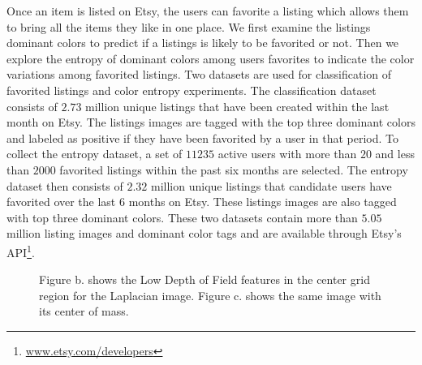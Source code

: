 \documentclass[conference,a4paper]{IEEEtran}
\begin{document}
Once an item is listed on Etsy, the
users can favorite a listing which allows them to bring all the items
they like in one place. We first examine the listings dominant colors
to predict if a listings is likely to be favorited or not. Then we
explore the entropy of dominant colors among users favorites to
indicate the color variations among favorited listings.
 Two datasets are used for
classification of favorited listings and color entropy
experiments. The classification dataset consists of $2.73$ million unique
listings that have been created within the last month on Etsy. The
listings images are tagged with the top three dominant colors and
labeled as positive if they have been favorited by a user in that period. 
To collect the entropy dataset, a set of $11235$ active users with more
than $20$ and less than $2000$ favorited listings within the past six
months are selected. The entropy dataset then consists of $2.32$ million unique listings that candidate
users have favorited over the last 6 months on Etsy. These listings
images are also tagged with top three dominant colors. These two
datasets contain more than $5.05$ million listing images and dominant
color tags and are available through Etsy's API\footnote{\url{www.etsy.com/developers}}.

\begin{figure}
  \centering
  \caption{
  Figure b. shows the Low Depth of Field features in the center grid region for the Laplacian image.  Figure c. shows the same image with its center of mass.
  }
  \label{fig:lowdof}
\end{figure}
\end{document}

